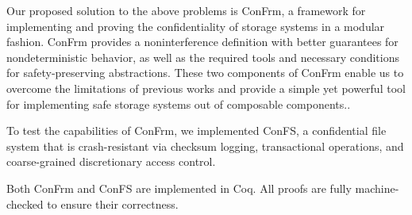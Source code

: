 Our proposed solution to the above problems is ConFrm, a framework for 
implementing and proving the confidentiality of storage systems in a modular fashion. ConFrm provides a noninterference definition with better guarantees for nondeterministic behavior, as well as the required tools and necessary conditions for safety-preserving abstractions. These two components of ConFrm enable us to overcome the limitations of previous works and provide a simple yet powerful tool for implementing safe storage systems out of composable components..


To test the capabilities of ConFrm, we implemented ConFS, a confidential file system that is crash-resistant via checksum logging, transactional operations, and coarse-grained discretionary access control. 

Both ConFrm and ConFS are implemented in Coq. All proofs are fully machine-checked to ensure their correctness. 

